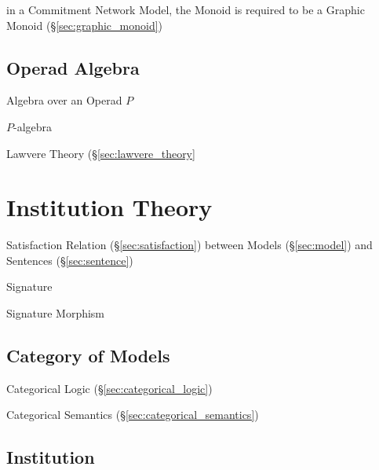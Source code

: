 in a Commitment Network Model, the Monoid is required to be a Graphic Monoid
(\S\ref{sec:graphic_monoid})



\subsection{Operad Algebra}\label{sec:operad_algebra}

Algebra over an Operad $P$

$P$-algebra

Lawvere Theory (\S\ref{sec:lawvere_theory}



\section{Institution Theory}\label{sec:institution_theory}

Satisfaction Relation (\S\ref{sec:satisfaction}) between Models
(\S\ref{sec:model}) and Sentences (\S\ref{sec:sentence})

Signature

Signature Morphism



\subsection{Category of Models}\label{sec:category_of_models}

Categorical Logic (\S\ref{sec:categorical_logic})

Categorical Semantics (\S\ref{sec:categorical_semantics})



\subsection{Institution}\label{sec:institution}

